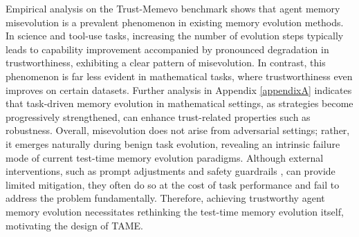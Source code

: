 \documentclass{article}
\theoremstyle{plain}
\theoremstyle{definition}
\theoremstyle{remark}
\begin{document}
Empirical analysis on the Trust-Memevo benchmark shows that agent memory misevolution is a prevalent phenomenon in existing memory evolution methods. In science and tool-use tasks, increasing the number of evolution steps typically leads to capability improvement accompanied by pronounced degradation in trustworthiness, exhibiting a clear pattern of misevolution. In contrast, this phenomenon is far less evident in mathematical tasks, where trustworthiness even improves on certain datasets. Further analysis in Appendix \ref{appendixA} indicates that task-driven memory evolution in mathematical settings, as strategies become progressively strengthened, can enhance trust-related properties such as robustness. Overall, misevolution does not arise from adversarial settings; rather, it emerges naturally during benign task evolution, revealing an intrinsic failure mode of current test-time memory evolution paradigms. Although external interventions, such as prompt adjustments \cite{shao2025your} and safety guardrails \cite{luo2025agentauditor,wei2025memguard}, can provide limited mitigation, they often do so at the cost of task performance and fail to address the problem fundamentally. Therefore, achieving trustworthy agent memory evolution necessitates rethinking the test-time memory evolution itself, motivating the design of TAME.



\end{document}
